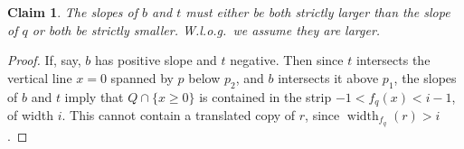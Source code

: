 \documentclass{amsart}
\theoremstyle{plain}
\newtheorem{claim}[theorem]{Claim}
\theoremstyle{definition}
\newcommand{\width}{\operatorname{width}}
\begin{document}
%

\begin{claim}
The slopes of $b$ and $t$ must either be both strictly larger than the slope of $q$ or both be strictly smaller. W.l.o.g.~we assume they are larger.
\end{claim}

\begin{proof}
If, say, $b$ has positive slope and $t$ negative. Then since $t$ intersects the vertical line $x=0$ spanned by $p$ below $p_2$, and $b$ intersects it above $p_1$, the slopes of $b$ and $t$ imply that  $Q \cap \{x\ge 0\}$ is contained in the strip $-1<f_q(x)<i-1$, of width $i$. This cannot contain a translated copy of $r$, since $\width_{f_q}(r) >i$ .
\end{proof}
\end{document}
